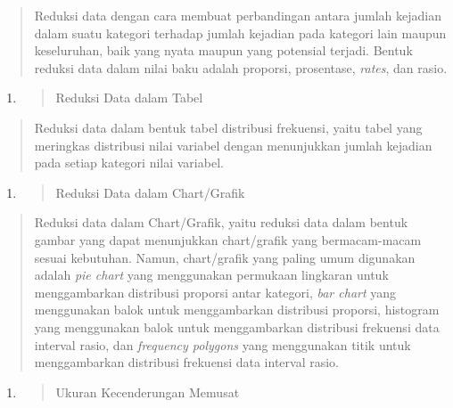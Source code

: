 \documentclass[
]{article}
\begin{document}
\begin{quote}
Reduksi data dengan cara membuat perbandingan antara jumlah kejadian
dalam suatu kategori terhadap jumlah kejadian pada kategori lain maupun
keseluruhan, baik yang nyata maupun yang potensial terjadi. Bentuk
reduksi data dalam nilai baku adalah proporsi, prosentase, \emph{rates},
dan rasio.
\end{quote}

\begin{enumerate}
\def\labelenumi{\arabic{enumi}.}
\setcounter{enumi}{1}
\item
  \begin{quote}
  Reduksi Data dalam Tabel
  \end{quote}
\end{enumerate}

\begin{quote}
Reduksi data dalam bentuk tabel distribusi frekuensi, yaitu tabel yang
meringkas distribusi nilai variabel dengan menunjukkan jumlah kejadian
pada setiap kategori nilai variabel.
\end{quote}

\begin{enumerate}
\def\labelenumi{\arabic{enumi}.}
\setcounter{enumi}{2}
\item
  \begin{quote}
  Reduksi Data dalam Chart/Grafik
  \end{quote}
\end{enumerate}

\begin{quote}
Reduksi data dalam Chart/Grafik, yaitu reduksi data dalam bentuk gambar
yang dapat menunjukkan chart/grafik yang bermacam-macam sesuai
kebutuhan. Namun, chart/grafik yang paling umum digunakan adalah
\emph{pie chart} yang menggunakan permukaan lingkaran untuk
menggambarkan distribusi proporsi antar kategori, \emph{bar chart} yang
menggunakan balok untuk menggambarkan distribusi proporsi, histogram
yang menggunakan balok untuk menggambarkan distribusi frekuensi data
interval rasio, dan \emph{frequency polygons} yang menggunakan titik
untuk menggambarkan distribusi frekuensi data interval rasio.
\end{quote}

\begin{enumerate}
\def\labelenumi{\Alph{enumi}.}
\setcounter{enumi}{1}
\item
  \begin{quote}
  Ukuran Kecenderungan Memusat
  \end{quote}
\end{enumerate}
\end{document}
